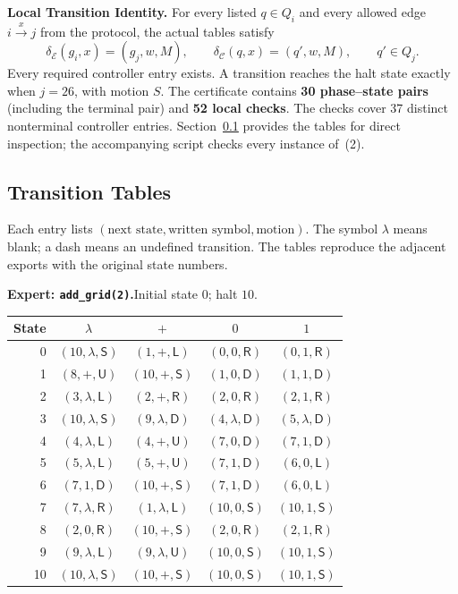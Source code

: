 \documentclass[11pt,a4paper]{article}
\newcommand{\blank}{\lambda}
\newcommand{\EXPERT}{\mathcal E}
\newcommand{\CTRL}{\mathcal C}
\newcommand{\triple}[3]{(#1,#2,\mathsf{#3})}
\newcommand{\code}[1]{\texttt{#1}}
\begin{document}
\textbf{Local Transition Identity.} For every listed $q\in Q_i$ and every allowed
edge $i\xrightarrow{x}j$ from the protocol, the actual tables satisfy
\begin{equation}
\delta_\EXPERT(g_i,x)=(g_j,w,M),\qquad
\delta_\CTRL(q,x)=(q',w,M),\qquad q'\in Q_j. \tag{2}
\end{equation}
Every required controller entry exists. A transition reaches the halt
state exactly when $j=26$, with motion $S$.
The certificate contains \textbf{30 phase--state pairs} (including the terminal pair)
and \textbf{52 local checks}. The checks cover 37 distinct nonterminal
controller entries. Section~\ref{sec:tables} provides the tables for direct
inspection; the accompanying script checks every instance of~(2).

\newpage
\subsection{Transition Tables}\label{sec:tables}
Each entry lists $(\text{next state},\text{written symbol},\text{motion})$.
The symbol $\blank$ means blank; a dash means an undefined transition.
The tables reproduce the adjacent exports with the original state numbers.

\textbf{Expert: \code{add\_grid(2)}.}\quad Initial state $0$; halt $10$.
\begin{center}
\fontsize{9.4}{11.2}\selectfont\renewcommand{\arraystretch}{1.06}
\setlength{\tabcolsep}{10pt}
\begin{tabular}{rcccc}
\toprule
\rowcolor{Pale}State & $\blank$ & $+$ & $0$ & $1$\\
\midrule
0 & $\triple{10}{\blank}{S}$ & $\triple{1}{+}{L}$ & $\triple{0}{0}{R}$ & $\triple{0}{1}{R}$ \\
1 & $\triple{8}{+}{U}$ & $\triple{10}{+}{S}$ & $\triple{1}{0}{D}$ & $\triple{1}{1}{D}$ \\
2 & $\triple{3}{\blank}{L}$ & $\triple{2}{+}{R}$ & $\triple{2}{0}{R}$ & $\triple{2}{1}{R}$ \\
3 & $\triple{10}{\blank}{S}$ & $\triple{9}{\blank}{D}$ & $\triple{4}{\blank}{D}$ & $\triple{5}{\blank}{D}$ \\
4 & $\triple{4}{\blank}{L}$ & $\triple{4}{+}{U}$ & $\triple{7}{0}{D}$ & $\triple{7}{1}{D}$ \\
5 & $\triple{5}{\blank}{L}$ & $\triple{5}{+}{U}$ & $\triple{7}{1}{D}$ & $\triple{6}{0}{L}$ \\
6 & $\triple{7}{1}{D}$ & $\triple{10}{+}{S}$ & $\triple{7}{1}{D}$ & $\triple{6}{0}{L}$ \\
7 & $\triple{7}{\blank}{R}$ & $\triple{1}{\blank}{L}$ & $\triple{10}{0}{S}$ & $\triple{10}{1}{S}$ \\
8 & $\triple{2}{0}{R}$ & $\triple{10}{+}{S}$ & $\triple{2}{0}{R}$ & $\triple{2}{1}{R}$ \\
9 & $\triple{9}{\blank}{L}$ & $\triple{9}{\blank}{U}$ & $\triple{10}{0}{S}$ & $\triple{10}{1}{S}$ \\
10 & $\triple{10}{\blank}{S}$ & $\triple{10}{+}{S}$ & $\triple{10}{0}{S}$ & $\triple{10}{1}{S}$ \\
\bottomrule
\end{tabular}
\end{center}
\end{document}
